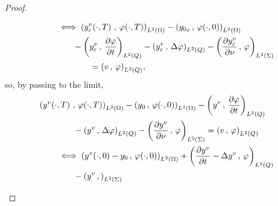 \begin{proof}
\begin{enumerate}
\begin{equation*}
\begin{split}
                    &\qquad\iff \scalaireohm{%
                        \condfinale{y_{\veps}^{v}}
                    }{%
                        \condfinale{\vphi}
                    } - \scalaireohm{%
                        {y_{0}}_{\veps}
                    }{%
                        \condinitiale{\vphi}
                    }\\
                    &\qquad\qquad - \scalaireq{%
                        y_{\veps}^{v}
                    }{%
                        \primetemps{\vphi}
                    } - \scalaireq{%
                        y_{\veps}^{v}
                    }{%
                        \Delta\vphi{}
                    } - \scalaires{%
                        \deriveenormale{y_{\veps}^{v}}
                    }{%
                        \vphi{}
                    }\\
                    &\qquad\qquad\qquad = \scalaireq{v}{\vphi},
                \end{split}
            \end{equation*}
            so, by passing to the limit,
            \begin{equation*}
                \begin{split}
                    {} & \scalaireohm{%
                        \condfinale{y^{v}}
                    }{%
                        \condfinale{\vphi}
                    } - \scalaireohm{%
                        y_{0}
                    }{%
                        \condinitiale{\vphi}
                    } - \scalaireq{%
                        y^{v}
                    }{%
                        \primetemps{\vphi}
                    }\\
                    &\qquad\qquad - \scalaireq{%
                        y^{v}
                    }{%
                        \Delta\vphi{}
                    } - \scalaires{%
                        \deriveenormale{y^{v}}
                    }{%
                        \vphi{}
                    } = \scalaireq{v}{\vphi}\\
                    &\qquad \iff \scalaireohm{%
                        \condinitiale{y^{v}} - y_{0}
                    }{%
                        \condinitiale{\vphi}
                    } + \scalaireq{%
                        \primetemps{y^{v}} - \Delta y^{v}
                    }{%
                        \vphi{}
                    }\\
                    &\qquad\qquad - \scalaires{%
                        y^{v}
                    }{%
}
\end{split}
\end{equation*}
\end{enumerate}
\end{proof}
